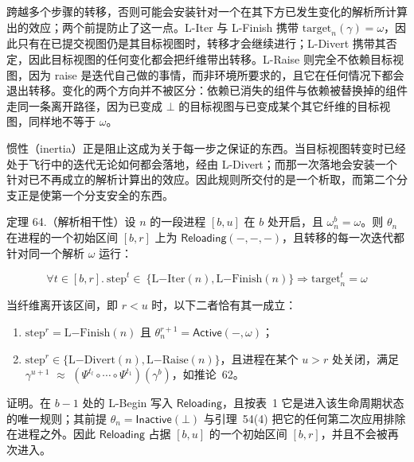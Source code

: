 \documentclass[
  10
]{article}
\begin{document}
跨越多个步骤的转移，否则可能会安装针对一个在其下方已发生变化的解析所计算出的效应；两个前提防止了这一点。L-Iter 与 L-Finish 携带 \(\mathrm { t a r g e t } _ { n } ( \gamma ) = \omega\)，因此只有在已提交视图仍是其目标视图时，转移才会继续进行；L-Divert 携带其否定，因此目标视图的任何变化都会把纤维带出转移。L-Raise 则完全不依赖目标视图，因为 raise 是迭代自己做的事情，而非环境所要求的，且它在任何情况下都会退出转移。变化的两个方向并不被区分：依赖已消失的组件与依赖被替换掉的组件走同一条离开路径，因为已变成 \(\bot\) 的目标视图与已变成某个其它纤维的目标视图，同样地不等于 \(\omega\)。

惯性（inertia）正是阻止这成为关于每一步之保证的东西。当目标视图转变时已经处于飞行中的迭代无论如何都会落地，经由 L-Divert；而那一次落地会安装一个针对已不再成立的解析计算出的效应。因此规则所交付的是一个析取，而第二个分支正是使第一个分支安全的东西。

定理 64.（解析相干性）设 \(n\) 的一段进程 \([ b , u ]\) 在 \(b\) 处开启，且 \(\omega _ { n } ^ { b } = \omega\)。则 \(\theta _ { n }\) 在进程的一个初始区间 \([ b , r ]\) 上为 \(\mathsf { R e l o a d i n g } ( - , - , - )\)，且转移的每一次迭代都针对同一个解析 \(\omega\) 运行：

\[
\forall t \in [ b , r ] . \ \mathrm { s t e p } ^ { t } \in \ \{ \mathrm { L } \mathrm { - } \mathrm { I t e r } ( n ) , \mathrm { L } \mathrm { - } \mathrm { F i n i s h } ( n ) \} \Rightarrow \mathrm { t a r g e t } _ { n } ^ { t } = \omega\tag{59}
\]

当纤维离开该区间，即 \(r < u\) 时，以下二者恰有其一成立：

\begin{enumerate}
\def\labelenumi{\arabic{enumi}.}
\item
  \(\mathrm { s t e p } ^ { r } = \mathrm { L } \mathrm { - F i n i s h } ( n )\) 且 \(\theta _ { n } ^ { r + 1 } = \mathsf { A c t i v e } ( - , \omega )\)；
\item
  \(\mathrm { s t e p } ^ { r } \in \{ \mathrm { L } \mathrm { - D i v e r t } ( n ) , \mathrm { L } \mathrm { - R a i s e } ( n ) \}\)，且进程在某个 \(u > r\) 处关闭，满足 \(\gamma ^ { u + 1 }\) $\approx$ \(\left( \Psi ^ { t _ { l } } \circ \cdots \circ \Psi ^ { t _ { 1 } } \right) \left( \gamma ^ { b } \right)\)，如推论~62。
\end{enumerate}

证明。在 \(b - 1\) 处的 L-Begin 写入 \(\mathsf { R e l o a d i n g }\)，且按表~1 它是进入该生命周期状态的唯一规则；其前提 \(\theta _ { n } = \mathsf { I n a c t i v e } ( \bot )\) 与引理~54(4) 把它的任何第二次应用排除在进程之外。因此 \(\mathsf { R e l o a d i n g }\) 占据 \([ b , u ]\) 的一个初始区间 \([ b , r ]\)，并且不会被再次进入。
\end{document}
